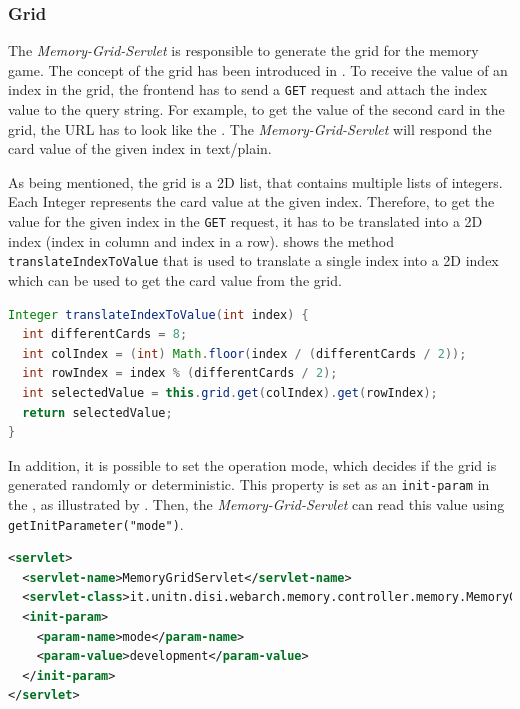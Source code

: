 \subsubsection{Grid}\label{subsubsec:03_impl_backend_grid}
The \textit{Memory-Grid-Servlet} is responsible to generate the grid for the memory game. The concept of the grid has been introduced in .
To receive the value of an index in the grid, the frontend has to send a \texttt{GET} request and attach the index value to the query string. For example, to get the value of the second card in the grid, the URL has to look like the .
The \textit{Memory-Grid-Servlet} will respond the card value of the given index in text/plain.

As being mentioned, the grid is a 2D list, that contains multiple lists of integers. Each Integer represents the card value at the given index. Therefore, to get the value for the given index in the \texttt{GET} request, it has to be translated into a 2D index (index in column and index in a row).  shows the method \texttt{translateIndexToValue} that is used to translate a single index into a 2D index which can be used to get the card value from the grid.
\begin{lstlisting}[label=lst:03_impl_backend_backend_grid_translate, caption=The \texttt{translateIndexToValue} method, language=java]
Integer translateIndexToValue(int index) {
  int differentCards = 8;
  int colIndex = (int) Math.floor(index / (differentCards / 2));
  int rowIndex = index % (differentCards / 2);
  int selectedValue = this.grid.get(colIndex).get(rowIndex);
  return selectedValue;
}
\end{lstlisting}

In addition, it is possible to set the operation mode, which decides if the grid is generated randomly or deterministic. This property is set as an \texttt{init-param} in the , as illustrated by . Then, the \textit{Memory-Grid-Servlet} can read this value using \texttt{getInitParameter("mode")}.
\begin{lstlisting}[label=lst:03_impl_backend_backend_grid_mode, caption=\texttt{init-param} to set the mode, language=xml]
<servlet>
  <servlet-name>MemoryGridServlet</servlet-name>
  <servlet-class>it.unitn.disi.webarch.memory.controller.memory.MemoryGridServlet</servlet-class>
  <init-param>
    <param-name>mode</param-name>
    <param-value>development</param-value>
  </init-param>
</servlet>
\end{lstlisting}


